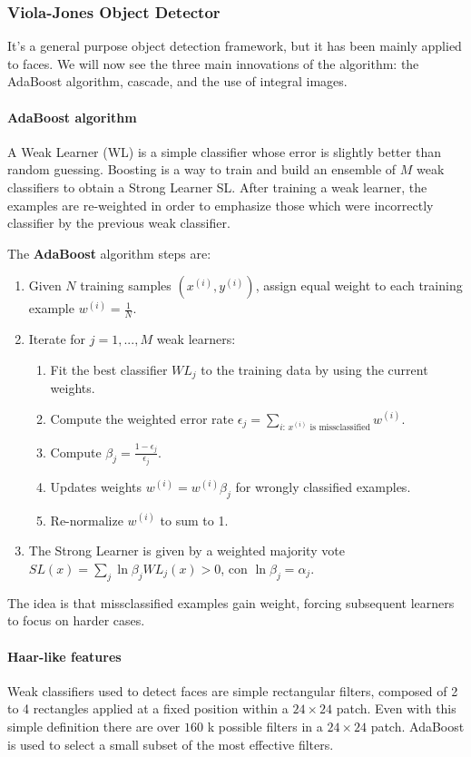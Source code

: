 \documentclass{article}
\begin{document}
\subsubsection{Viola-Jones Object Detector}
It's a general purpose object detection framework, but it has been mainly applied to faces.
We will now see the three main innovations of the algorithm: the AdaBoost algorithm, cascade, and the use of integral images.

\paragraph{AdaBoost algorithm}
A Weak Learner (WL) is a simple classifier whose error is slightly better than random guessing.
Boosting is a way to train and build an ensemble of $M$ weak classifiers to obtain a Strong Learner SL.
After training a weak learner, the examples are re-weighted in order to emphasize those which were incorrectly classifier by the previous weak classifier.

The \textbf{AdaBoost} algorithm steps are:
\begin{enumerate}
  \item Given $N$ training samples $(x^(i), y^(i))$, assign equal weight to each training example $w^(i)=\frac{1}{N}$.
  \item Iterate for $j = 1, ..., M$ weak learners:
  \begin{enumerate}
    \item Fit the best classifier $WL_j$ to the training data by using the current weights.
    \item Compute the weighted error rate $\epsilon_j = \sum_{i:\, x^{(i)} \text{ is missclassified}} w^{(i)}$.
    \item Compute $\beta_j = \frac{1 - \epsilon_j}{\epsilon_j}$.
    \item Updates weights $w^(i) = w^(i)\beta_j$ for wrongly classified examples.
    \item Re-normalize $w^(i)$ to sum to 1.
  \end{enumerate}
  \item The Strong Learner is given by a weighted majority vote $SL(x) = \sum_{j} \ln \beta_j WL_j(x) > 0$, con $\ln \beta_j = \alpha_j$.
\end{enumerate}

The idea is that missclassified examples gain weight, forcing subsequent learners to focus on harder cases.

\paragraph{Haar-like features}
Weak classifiers used to detect faces are simple rectangular filters, composed of 2 to 4 rectangles applied at a fixed position within a $24 \times 24$ patch.
Even with this simple definition there are over $160$ k possible filters in a $24 \times 24$ patch.
AdaBoost is used to select a small subset of the most effective filters.
\end{document}
